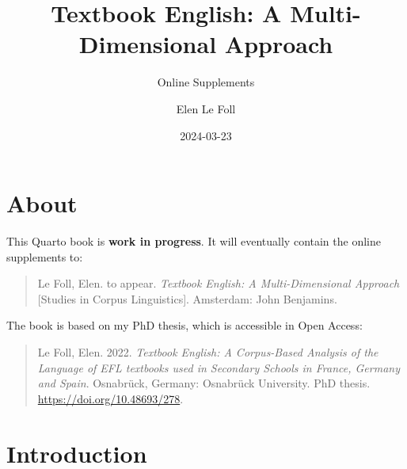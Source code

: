 \documentclass[
  letterpaper,
  DIV=11,
  numbers=noendperiod]{scrreprt}
\title{Textbook English: A Multi-Dimensional Approach}
\subtitle{Online Supplements}
\author{Elen Le Foll}
\date{2024-03-23}
\renewcommand*\contentsname{Table of contents}
\newcommand\contentsname{Table of contents}
\begin{document}
\maketitle

\renewcommand*\contentsname{Table of contents}
{
\hypersetup{linkcolor=}
\setcounter{tocdepth}{2}
\tableofcontents
}

\chapter*{About}\label{about}


\begin{tcolorbox}[enhanced jigsaw, colframe=quarto-callout-warning-color-frame, title=\textcolor{quarto-callout-warning-color}{\faExclamationTriangle}\hspace{0.5em}{Warning}, toptitle=1mm, toprule=.15mm, opacityback=0, colbacktitle=quarto-callout-warning-color!10!white, bottomtitle=1mm, arc=.35mm, opacitybacktitle=0.6, colback=white, rightrule=.15mm, coltitle=black, left=2mm, titlerule=0mm, bottomrule=.15mm, leftrule=.75mm, breakable]

This Quarto book is \textbf{work in progress}. It will eventually
contain the online supplements to:

\begin{quote}
Le Foll, Elen. to appear. \emph{Textbook English: A Multi-Dimensional
Approach} {[}Studies in Corpus Linguistics{]}. Amsterdam: John
Benjamins.
\end{quote}

\end{tcolorbox}

The book is based on my PhD thesis, which is accessible in Open Access:

\begin{quote}
Le Foll, Elen. 2022. \emph{Textbook English: A Corpus-Based Analysis of
the Language of EFL textbooks used in Secondary Schools in France,
Germany and Spain}. Osnabrück, Germany: Osnabrück University. PhD
thesis. \url{https://doi.org/10.48693/278}.
\end{quote}


\chapter{Introduction}\label{introduction}
\end{document}
